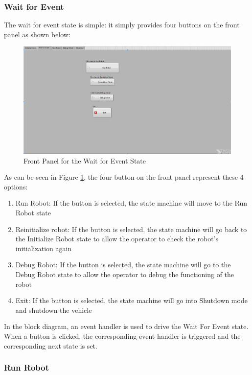 \subsubsection{Wait for Event}

The wait for event state is simple: it simply provides four buttons on the front panel as shown below:

\begin{figure}[h!]
\centering
\includegraphics[scale=0.4]{Photos/waitforevent.png}
\caption{Front Panel for the Wait for Event State}
\label{fig:waitforevent}
\end{figure}

\noindent As can be seen in Figure \ref{fig:waitforevent}, the four button on the front panel represent these 4 options:

\begin{enumerate}
\item Run Robot: If the button is selected, the state machine will move to the Run Robot state
\item Reinitialize robot: If the button is selected, the state machine will go back to the Initialize Robot state to allow the operator to check the robot's initialization again
\item Debug Robot: If the button is selected, the state machine will go to the Debug Robot state to allow the operator to debug the functioning of the robot
\item Exit: If the button is selected, the state machine will go into Shutdown mode and shutdown the vehicle
\end{enumerate}

\noindent In the block diagram, an event handler is used to drive the Wait For Event state. When a button is clicked, the corresponding event handler is triggered and the corresponding next state is set.

\subsubsection{Run Robot}


